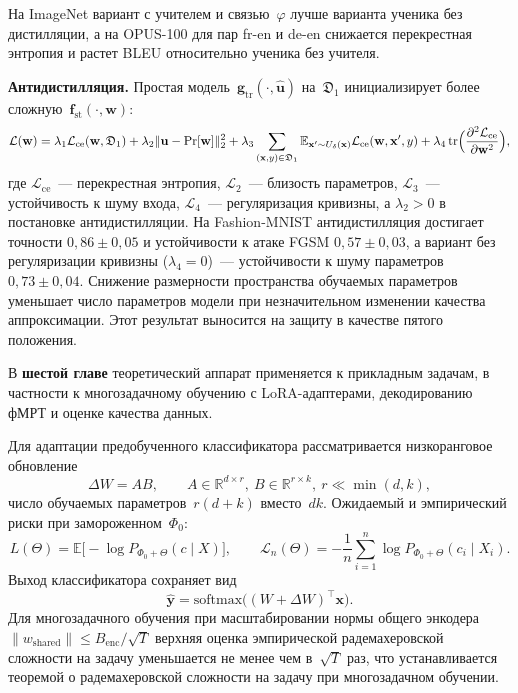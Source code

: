 \documentclass{dissert}
\newcommand{\paragraph}[1]{\noindent\textbf{#1}\quad}
\begin{document}
На ImageNet вариант с учителем и связью~$\varphi$ лучше варианта ученика без дистилляции, а на OPUS-100 для пар fr-en и de-en снижается перекрестная энтропия и растет BLEU относительно ученика без учителя.

\paragraph{Антидистилляция.}
Простая модель~$\mathbf{g}_{\mathrm{tr}}(\cdot,\hat{\mathbf{u}})$ на~$\mathfrak{D}_1$ инициализирует более сложную~$\mathbf{f}_{\mathrm{st}}(\cdot,\mathbf{w})$:
\begin{equation}
    \mathcal{L}(\mathbf{w})
    =
    \lambda_1\mathcal{L}_{\mathrm{ce}}(\mathbf{w},\mathfrak{D}_1)
    +
    \lambda_2\|\mathbf{u}-\mathrm{Pr}[\mathbf{w}]\|_2^2
    +
    \lambda_3\sum_{(\mathbf{x},y)\in\mathfrak{D}_1}
        \mathbb{E}_{\mathbf{x}'\sim U_\delta(\mathbf{x})}\mathcal{L}_{\mathrm{ce}}(\mathbf{w},\mathbf{x}',y)
    +
    \lambda_4\,\mathrm{tr}\Bigl(\frac{\partial^2\mathcal{L}_{\mathrm{ce}}}{\partial\mathbf{w}^2}\Bigr),
\end{equation}
где $\mathcal{L}_{\mathrm{ce}}$~--- перекрестная энтропия, $\mathcal{L}_2$~--- близость параметров, $\mathcal{L}_3$~--- устойчивость к шуму входа, $\mathcal{L}_4$~--- регуляризация кривизны, а $\lambda_2>0$ в постановке антидистилляции.
На Fashion-MNIST антидистилляция достигает точности $0{,}86\pm 0{,}05$ и устойчивости к атаке FGSM $0{,}57\pm 0{,}03$, а вариант без регуляризации кривизны ($\lambda_4=0$)~--- устойчивости к шуму параметров $0{,}73\pm 0{,}04$.
Снижение размерности пространства обучаемых параметров уменьшает число параметров модели при незначительном изменении качества аппроксимации. Этот результат выносится на защиту в качестве пятого положения.

В \textbf{шестой главе} теоретический аппарат применяется к прикладным задачам, в частности к многозадачному обучению с LoRA-адаптерами, декодированию фМРТ и оценке качества данных.

Для адаптации предобученного классификатора рассматривается низкоранговое обновление
\[
    \Delta W=AB,\qquad A\in\mathbb{R}^{d\times r},\ B\in\mathbb{R}^{r\times k},\ r\ll\min(d,k),
\]
число обучаемых параметров~$r(d+k)$ вместо~$dk$.
Ожидаемый и эмпирический риски при замороженном~$\Phi_0$:
\[
    L(\Theta)=\mathbb{E}\bigl[-\log P_{\Phi_0+\Theta}(c\mid X)\bigr],
    \qquad
    \mathscr{L}_n(\Theta)=-\frac1n\sum_{i=1}^n\log P_{\Phi_0+\Theta}(c_i\mid X_i).
\]
Выход классификатора сохраняет вид
\[
    \hat{\mathbf{y}}=\mathrm{softmax}\bigl((W+\Delta W)^\top\mathbf{x}\bigr).
\]
Для многозадачного обучения при масштабировании нормы общего энкодера $\|w_{\mathrm{shared}}\|\le B_{\mathrm{enc}}/\sqrt{T}$ верхняя оценка эмпирической радемахеровской сложности на задачу уменьшается не менее чем в~$\sqrt{T}$ раз, что устанавливается теоремой о радемахеровской сложности на задачу при многозадачном обучении.
\end{document}
